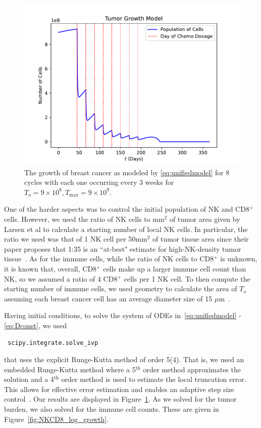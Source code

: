 \documentclass[11pt]{amsart}
\begin{document}
\begin{figure}[h!]
\vspace*{-3mm}
\begin{center} %
\includegraphics[scale=0.6]{./images/growth_8T_3W_C45.pdf} %
\end{center}
\caption{The growth of breast cancer  as modeled by \eqref{eq:unifiedmodel} for 8 cycles with each one occurring every 3 weeks for $T_o=9\times 10^8, T_{\max}=9\times10^9$.}
\label{fig:FullODE} %
\end{figure}

One of the harder aspects was to control the initial population of NK and CD8$^+$ cells.
However, we used the ratio of NK cells to mm$^2$ of tumor area given by Larsen et al to calculate a starting number of local NK cells.
In particular, the ratio we used was that of 1 NK cell per 50mm$^2$ of tumor tissue area since their paper proposes that 1:35 is an ``at-best" estimate for high-NK-density tumor tissue\ \cite{SopikTumorSize}.
As for the immune cells, while the ratio of NK cells to CD8$^+$ is unknown, it is known that, overall, CD8$^+$ cells make up a larger immune cell count than NK, so we assumed
a ratio of 4 CD8$^+$ cells per 1 NK cell.
To then compute the starting number of immune cells, we used geometry to calculate the area of $T_o$ assuming each breast cancer cell has an average diameter size of 15 $\mu$m\ \cite{BabitaShashni2018b17-00776}.

Having initial conditions, to solve the system of ODEs in\ \eqref{eq:unifiedmodel} -  \eqref{eq:Dconst}, we used \begin{verbatim} scipy.integrate.solve_ivp \end{verbatim}
that uses the explicit Runge-Kutta method of order 5(4).
That is, we used an embedded Runge-Kutta method where a 5$^\text{th}$ order method approximates the solution and a 4$^\text{th}$ order method is used to estimate the local truncation error.
This allows for effective error estimation and enables an adaptive step size control\ \cite{DORMAND198019}.
Our results are displayed in Figure~\ref{fig:FullODE}.
As we solved for the tumor burden, we also solved for the immune cell counts.
These are given in Figure~\ref{fig:NKCD8_log_growth}.
\end{document}
